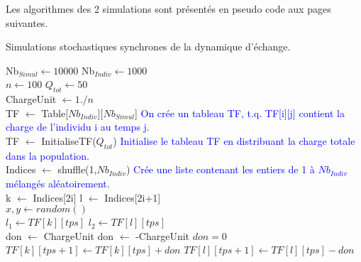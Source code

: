 Les algorithmes des 2 simulations sont présentés en pseudo code aux pages suivantes.

\clearpage

\begin{algorithm}
\caption{Simulations stochastiques synchrones de la dynamique d'échange.}
\begin{algorithmic}

\State Nb$_{Simul} \gets 10000$
\State Nb$_{Indiv} \gets 1000$\\


\State $n \gets 100$
\State $Q_{tot} \gets 50$\\

\State ChargeUnit $\gets 1./n$\\

\State TF $\gets$ Table[$Nb_{Indiv}$][$Nb_{Simul}$]
\State \textcolor{blue}{On crée un tableau TF, t.q. TF[i][j] contient la charge de l'individu i au temps j.}\\
\State TF $\gets$ InitialiseTF($Q_{tot}$)
\State \textcolor{blue}{Initialise le tableau TF en distribuant la charge totale dans la population.}\\

	\State Indices $\gets$ shuffle(1,$Nb_{Indiv}$) 
	\State \textcolor{blue}{Crée une liste contenant les entiers de 1 à $Nb_{Indiv}$ mélangés aléatoirement.}\\
		\State k $\gets$ Indices[2i]
		\State l $\gets$ Indices[2i+1] \\
		
		\State $x,y \gets random()$\\
		
		\State $l_1 \gets TF[k][tps]$
		\State $l_2 \gets TF[l][tps]$\\
		
			\State don $\gets$ ChargeUnit 
			\State don $\gets$ -ChargeUnit 
		\Else
			\State $don=0$
		\EndIf \\
		
		\State $TF[k][tps+1] \gets TF[k][tps]+don$
        \State $TF[l][tps+1] \gets TF[l][tps]-don$\\
	\EndFor
\EndFor



\end{algorithmic}
\end{algorithm}


